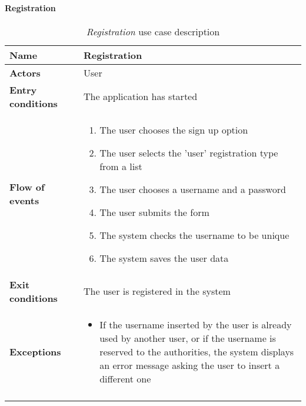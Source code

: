 		\paragraph{Registration}
		\begin{longtable}{p{0.25\linewidth}p{0.75\linewidth}}
			\toprule
			\textbf{Name} & \textbf{Registration} \\
			\midrule
			\textbf{Actors} & User \\
			\midrule
			\textbf{Entry conditions} & The application has started \\
			\midrule
			\textbf{Flow of events} & 
			\begin{enumerate}
				\item The user chooses the sign up option
				\item The user selects the 'user' registration type from a list
				\item The user chooses a username and a password
				\item The user submits the form
				\item The system checks the username to be unique
				\item The system saves the user data
			\end{enumerate} \\
			\midrule
			\textbf{Exit conditions} & The user is registered in the system\\
			\midrule
			\textbf{Exceptions} & 
			\begin{itemize}
				\item If the username inserted by the user is already used by another user, or if the username is reserved to the authorities, the system displays an error message asking the user to insert a different one
			\end{itemize} \\
			\bottomrule
			\caption{\emph{Registration} use case description}
		\end{longtable}
	
